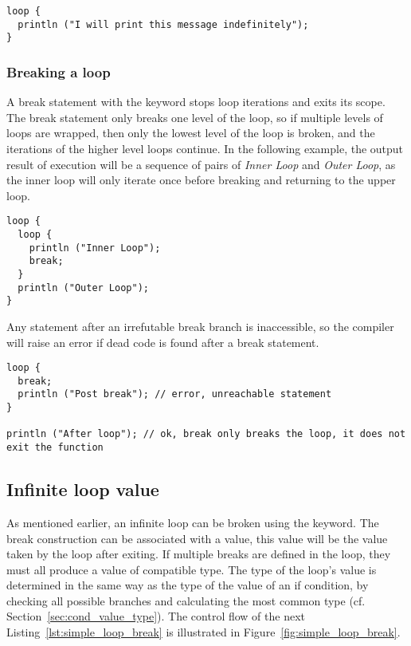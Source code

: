 \begin{lstlisting}[style=coloredverbatim, escapechar=@]
loop {
  println ("I will print this message indefinitely");
}
\end{lstlisting}

\subsubsection{Breaking a loop}
\label{sec:breaking_loops}

A break statement with the keyword  stops loop iterations and exits
its scope. The break statement only breaks one level of the loop, so if multiple
levels of loops are wrapped, then only the lowest level of the loop is broken,
and the iterations of the higher level loops continue. In the following example,
the output result of execution will be a sequence of pairs of \textit{Inner
  Loop} and \textit{Outer Loop}, as the inner loop will only iterate once before
breaking and returning to the upper loop.

\begin{lstlisting}[style=coloredverbatim, escapechar=@]
loop {
  loop {
    println ("Inner Loop");
    break;
  }
  println ("Outer Loop");
}
\end{lstlisting}

Any statement after an irrefutable break branch is inaccessible, so the compiler
will raise an error if dead code is found after a break statement.

\begin{lstlisting}[style=coloredverbatim, escapechar=@]
loop {
  break;
  println ("Post break"); // error, unreachable statement
}

println ("After loop"); // ok, break only breaks the loop, it does not exit the function
\end{lstlisting}

\subsection {Infinite loop value}

As mentioned earlier, an infinite loop can be broken using the 
keyword. The break construction can be associated with a value, this value will
be the value taken by the loop after exiting. If multiple breaks are defined in
the loop, they must all produce a value of compatible type. The type of the
loop's value is determined in the same way as the type of the value of an if
condition, by checking all possible branches and calculating the most common
type (cf. Section~\ref{sec:cond_value_type}). The control flow of the next
Listing~\ref{lst:simple_loop_break} is illustrated in
Figure~\ref{fig:simple_loop_break}.

